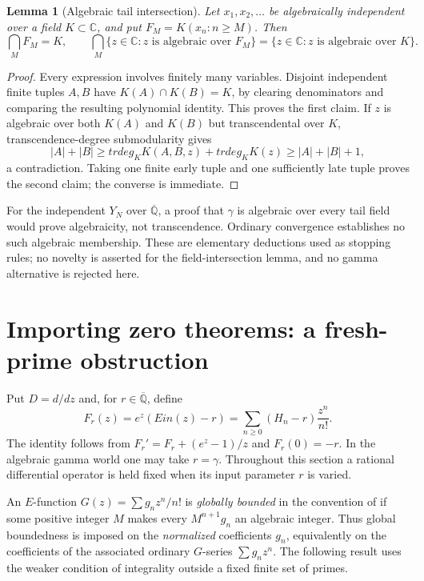\documentclass[11pt,a4paper]{article}
\newtheorem{lemma}[theorem]{Lemma}
\theoremstyle{definition}
\theoremstyle{remark}
\theoremstyle{plain}
\numberwithin{equation}{section}
\def\operatorname#1{#1}\def\mathrm#1{#1}}
\begin{document}
\begin{lemma}[Algebraic tail intersection]\label{em:tail-intersection}
Let $x_1,x_2,\ldots$ be algebraically independent over a field
$K\subset\mathbb C$, and put $F_M=K(x_n:n\ge M)$. Then
\[
 \bigcap_M F_M=K,
 \qquad
 \bigcap_M\{z\in\mathbb C:z\text{ is algebraic over }F_M\}
 =\{z\in\mathbb C:z\text{ is algebraic over }K\}.
\]
\end{lemma}
\begin{proof}
Every expression involves finitely many variables. Disjoint independent
finite tuples $A,B$ have $K(A)\cap K(B)=K$, by clearing denominators
and comparing the resulting polynomial identity. This proves the first
claim. If $z$ is algebraic over both $K(A)$ and $K(B)$ but transcendental
over $K$, transcendence-degree submodularity gives
\[
 |A|+|B|\ge
 \operatorname{trdeg}_K K(A,B,z)+\operatorname{trdeg}_K K(z)
 \ge |A|+|B|+1,
\]
a contradiction. Taking one finite early tuple and one sufficiently
late tuple proves the second claim; the converse is immediate.
\end{proof}

For the independent $Y_N$ over $\overline{\mathbb Q}$, a proof that
$\gamma$ is algebraic over every tail field would prove algebraicity,
not transcendence. Ordinary convergence establishes no such algebraic
membership. These are elementary deductions used as stopping rules;
no novelty is asserted for the field-intersection lemma, and no gamma
alternative is rejected here.

\section{Importing zero theorems: a fresh-prime obstruction}
\label{em:sec:imports}

Put $D=d/dz$ and, for $r\in\overline{\mathbb Q}$, define
\[
 F_r(z)=e^z(\operatorname{Ein}(z)-r)
       =\sum_{n\ge0}(H_n-r)\frac{z^n}{n!}.
\]
The identity follows from $F_r'=F_r+(e^z-1)/z$ and $F_r(0)=-r$.
In the algebraic gamma world one may take $r=\gamma$.
Throughout this section a rational differential operator is held fixed
when its input parameter $r$ is varied.

An $E$-function $G(z)=\sum g_nz^n/n!$ is \emph{globally bounded} in
the convention of \cite[Introduction]{FRzeros} if some positive
integer $M$ makes every $M^{n+1}g_n$ an algebraic integer. Thus global
boundedness is imposed on the \emph{normalized} coefficients $g_n$,
equivalently on the coefficients of the associated ordinary
$G$-series $\sum g_nz^n$. The following result uses the weaker
condition of integrality outside a fixed finite set of primes.
\end{document}
